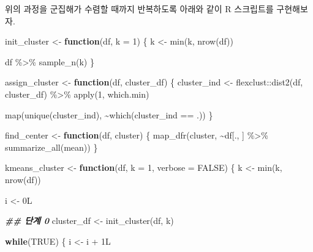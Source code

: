 \documentclass[
]{book}
\newenvironment{Shaded}{\begin{snugshade}}{\end{snugshade}}
\newcommand{\AttributeTok}[1]{\textcolor[rgb]{0.77,0.63,0.00}{#1}}
\newcommand{\ConstantTok}[1]{\textcolor[rgb]{0.00,0.00,0.00}{#1}}
\newcommand{\ControlFlowTok}[1]{\textcolor[rgb]{0.13,0.29,0.53}{\textbf{#1}}}
\newcommand{\DecValTok}[1]{\textcolor[rgb]{0.00,0.00,0.81}{#1}}
\newcommand{\DocumentationTok}[1]{\textcolor[rgb]{0.56,0.35,0.01}{\textbf{\textit{#1}}}}
\newcommand{\FunctionTok}[1]{\textcolor[rgb]{0.00,0.00,0.00}{#1}}
\newcommand{\NormalTok}[1]{#1}
\newcommand{\OtherTok}[1]{\textcolor[rgb]{0.56,0.35,0.01}{#1}}
\newcommand{\SpecialCharTok}[1]{\textcolor[rgb]{0.00,0.00,0.00}{#1}}
\begin{document}
위의 과정을 군집해가 수렴할 때까지 반복하도록 아래와 같이 R 스크립트를 구현해보자.

\begin{Shaded}
\begin{Highlighting}[]
\NormalTok{init\_cluster }\OtherTok{\textless{}{-}} \ControlFlowTok{function}\NormalTok{(df, }\AttributeTok{k =} \DecValTok{1}\NormalTok{) \{}
\NormalTok{  k }\OtherTok{\textless{}{-}} \FunctionTok{min}\NormalTok{(k, }\FunctionTok{nrow}\NormalTok{(df))}
  
\NormalTok{  df }\SpecialCharTok{\%\textgreater{}\%} \FunctionTok{sample\_n}\NormalTok{(k)}
\NormalTok{\}}

\NormalTok{assign\_cluster }\OtherTok{\textless{}{-}} \ControlFlowTok{function}\NormalTok{(df, cluster\_df) \{}
\NormalTok{  cluster\_ind }\OtherTok{\textless{}{-}}\NormalTok{ flexclust}\SpecialCharTok{::}\FunctionTok{dist2}\NormalTok{(df, cluster\_df) }\SpecialCharTok{\%\textgreater{}\%}
    \FunctionTok{apply}\NormalTok{(}\DecValTok{1}\NormalTok{, which.min)}
  
  \FunctionTok{map}\NormalTok{(}\FunctionTok{unique}\NormalTok{(cluster\_ind), }\SpecialCharTok{\textasciitilde{}}\FunctionTok{which}\NormalTok{(cluster\_ind }\SpecialCharTok{==}\NormalTok{ .))}
\NormalTok{\}}

\NormalTok{find\_center }\OtherTok{\textless{}{-}} \ControlFlowTok{function}\NormalTok{(df, cluster) \{}
  \FunctionTok{map\_dfr}\NormalTok{(cluster, }\SpecialCharTok{\textasciitilde{}}\NormalTok{df[., ] }\SpecialCharTok{\%\textgreater{}\%} \FunctionTok{summarize\_all}\NormalTok{(mean)) }
\NormalTok{\}}

\NormalTok{kmeans\_cluster }\OtherTok{\textless{}{-}} \ControlFlowTok{function}\NormalTok{(df, }\AttributeTok{k =} \DecValTok{1}\NormalTok{, }\AttributeTok{verbose =} \ConstantTok{FALSE}\NormalTok{) \{}
\NormalTok{  k }\OtherTok{\textless{}{-}} \FunctionTok{min}\NormalTok{(k, }\FunctionTok{nrow}\NormalTok{(df))}
  
\NormalTok{  i }\OtherTok{\textless{}{-}}\NormalTok{ 0L}
  
  \DocumentationTok{\#\# 단계 0}
\NormalTok{  cluster\_df }\OtherTok{\textless{}{-}} \FunctionTok{init\_cluster}\NormalTok{(df, k)}
  
  \ControlFlowTok{while}\NormalTok{(}\ConstantTok{TRUE}\NormalTok{) \{}
\NormalTok{    i }\OtherTok{\textless{}{-}}\NormalTok{ i }\SpecialCharTok{+}\NormalTok{ 1L}
    

\end{Highlighting}
\end{Shaded}
\end{document}
